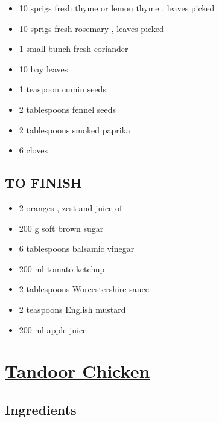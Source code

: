 \documentclass[]{article}
\providecommand{\tightlist}{%
  \setlength{\itemsep}{0pt}\setlength{\parskip}{0pt}}
\begin{document}
\begin{itemize}
\tightlist
\item
  10 sprigs fresh thyme or lemon thyme , leaves picked
\item
  10 sprigs fresh rosemary , leaves picked
\item
  1 small bunch fresh coriander
\item
  10 bay leaves
\item
  1 teaspoon cumin seeds
\item
  2 tablespoons fennel seeds
\item
  2 tablespoons smoked paprika
\item
  6 cloves
\end{itemize}

\hypertarget{to-finish}{%
\subsection{TO FINISH}\label{to-finish}}

\begin{itemize}
\tightlist
\item
  2 oranges , zest and juice of
\item
  200 g soft brown sugar
\item
  6 tablespoons balsamic vinegar
\item
  200 ml tomato ketchup
\item
  2 tablespoons Worcestershire sauce
\item
  2 teaspoons English mustard
\item
  200 ml apple juice
\end{itemize}

\hypertarget{tandoor-chicken}{%
\section{\texorpdfstring{\href{https://www.vahrehvah.com/tandoori-chicken}{Tandoor Chicken}}{Tandoor Chicken}}\label{tandoor-chicken}}

\hypertarget{ingredients-2}{%
\subsection{Ingredients}\label{ingredients-2}}
\end{document}
